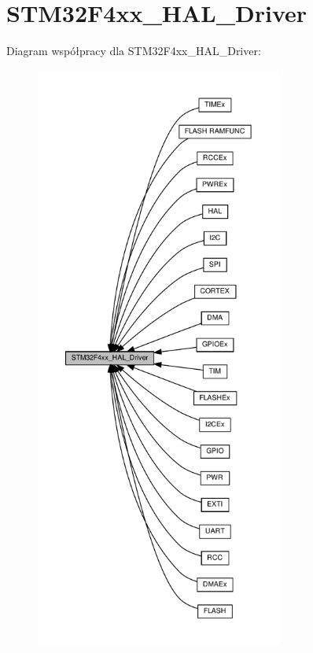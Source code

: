\hypertarget{group___s_t_m32_f4xx___h_a_l___driver}{}\section{S\+T\+M32\+F4xx\+\_\+\+H\+A\+L\+\_\+\+Driver}
\label{group___s_t_m32_f4xx___h_a_l___driver}
Diagram współpracy dla S\+T\+M32\+F4xx\+\_\+\+H\+A\+L\+\_\+\+Driver\+:\nopagebreak
\begin{figure}[H]
\begin{center}
\leavevmode
\includegraphics[height=550pt]{group___s_t_m32_f4xx___h_a_l___driver}
\end{center}
\end{figure}
